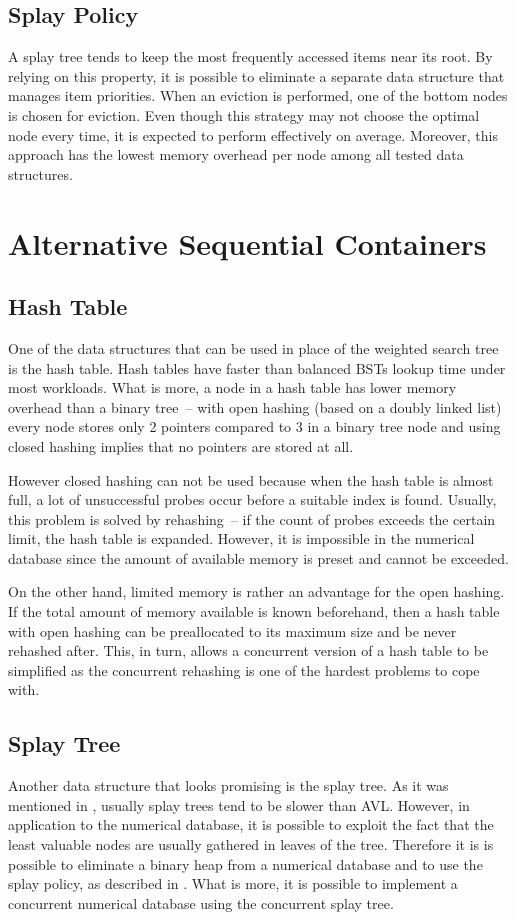 \subsection{Splay Policy}
\label{sssec:spolicy}
A splay tree tends to keep the most frequently accessed items near its root. By relying on this property, it is possible to eliminate a separate data structure that manages item priorities. When an eviction is performed, one of the bottom nodes is chosen for eviction. Even though this strategy may not choose the optimal node every time, it is expected to perform effectively on average. Moreover, this approach has the lowest memory overhead per node among all tested data structures.


\section{Alternative Sequential Containers}

\subsection{Hash Table}
One of the data structures that can be used in place of the weighted search tree is the hash table. Hash tables have faster than balanced BSTs lookup time under most workloads. What is more, a node in a hash table has lower memory overhead than a binary tree~-- with open hashing (based on a doubly linked list) every node stores only 2 pointers compared to 3 in a binary tree node and using closed hashing implies that no pointers are stored at all.

However closed hashing can not be used because when the hash table is almost full, a lot of unsuccessful probes occur before a suitable index is found. Usually, this problem is solved by rehashing~-- if the count of probes exceeds the certain limit, the hash table is expanded. However, it is impossible in the numerical database since the amount of available memory is preset and cannot be exceeded.

On the other hand, limited memory is rather an advantage for the open hashing. If the total amount of memory available is known beforehand, then a hash table with open hashing can be preallocated to its maximum size and be never rehashed after. This, in turn, allows a concurrent version of a hash table to be simplified as the concurrent rehashing is one of the hardest problems to cope with.

\subsection{Splay Tree}
Another data structure that looks promising is the splay tree.
As it was mentioned in , usually splay trees tend to be slower than AVL. However, in application to the numerical database, it is possible to exploit the fact that the least valuable nodes are usually gathered in leaves of the tree. Therefore it is is possible to eliminate a binary heap from a numerical database and to use the splay policy, as described in . What is more, it is possible to implement a concurrent numerical database using the concurrent splay tree\cite{cb_tree}.

